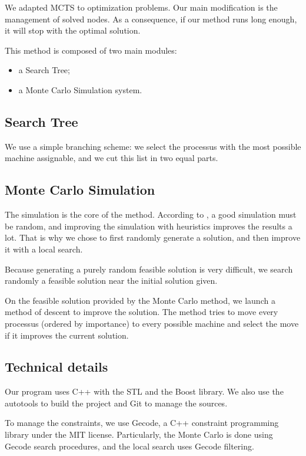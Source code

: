 \documentclass[a4paper,twocolumn]{article}
\begin{document}
We adapted MCTS to optimization problems. Our main modification is
the management of solved nodes.  As a consequence, if our method runs
long enough, it will stop with the optimal solution.

This method is composed of two main modules:
\begin{itemize}
\item a Search Tree;
\item a Monte Carlo Simulation system.
\end{itemize}

\subsection{Search Tree}

We use a simple branching scheme: we select the processus with the
most possible machine assignable, and we cut this list in two equal
parts.

\subsection{Monte Carlo Simulation}

The simulation is the core of the method.  According to
\cite{gelly2007contribution}, a good simulation must be random, and
improving the simulation with heuristics improves the results a lot.
That is why we chose to first randomly generate a solution, and
then improve it with a local search.

Because generating a purely random feasible solution is very
difficult, we search randomly a feasible solution near the
initial solution given.

On the feasible solution provided by the Monte Carlo method, we launch
a method of descent to improve the solution.  The method tries to move
every processus (ordered by importance) to every possible machine and
select the move if it improves the current solution.

\subsection{Technical details}

Our program uses C++ with the STL and the Boost library.  We also use
the autotools to build the project and Git to manage the sources.

To manage the constraints, we use Gecode, a C++ constraint programming
library under the MIT license.  Particularly, the Monte Carlo is done
using Gecode search procedures, and the local search uses Gecode
filtering.
\end{document}
